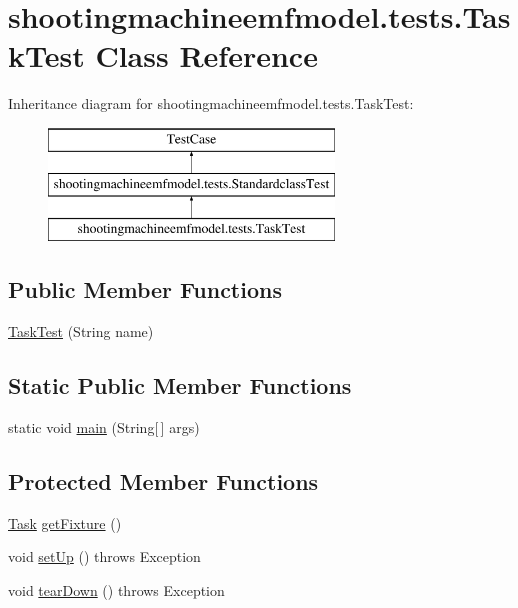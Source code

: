 \hypertarget{classshootingmachineemfmodel_1_1tests_1_1_task_test}{\section{shootingmachineemfmodel.\-tests.\-Task\-Test Class Reference}
\label{classshootingmachineemfmodel_1_1tests_1_1_task_test}
}
Inheritance diagram for shootingmachineemfmodel.\-tests.\-Task\-Test\-:\begin{figure}[H]
\begin{center}
\leavevmode
\includegraphics[height=3.000000cm]{classshootingmachineemfmodel_1_1tests_1_1_task_test}
\end{center}
\end{figure}
\subsection*{Public Member Functions}
\begin{DoxyCompactItemize}
\item 
\hyperlink{classshootingmachineemfmodel_1_1tests_1_1_task_test_a4b46325b12e11073c10f674c52447752}{Task\-Test} (String name)
\end{DoxyCompactItemize}
\subsection*{Static Public Member Functions}
\begin{DoxyCompactItemize}
\item 
static void \hyperlink{classshootingmachineemfmodel_1_1tests_1_1_task_test_a0e65b0276d315173c066ba70a8f29bd1}{main} (String\mbox{[}$\,$\mbox{]} args)
\end{DoxyCompactItemize}
\subsection*{Protected Member Functions}
\begin{DoxyCompactItemize}
\item 
\hyperlink{interfaceshootingmachineemfmodel_1_1_task}{Task} \hyperlink{classshootingmachineemfmodel_1_1tests_1_1_task_test_a1b6226741485449dbb6a3c9d65d60a35}{get\-Fixture} ()
\item 
void \hyperlink{classshootingmachineemfmodel_1_1tests_1_1_task_test_a73f5c03c194fb90aaa9d711fccf2a411}{set\-Up} ()  throws Exception 
\item 
void \hyperlink{classshootingmachineemfmodel_1_1tests_1_1_task_test_afe624a47188a8c7287131a79d4a7be6f}{tear\-Down} ()  throws Exception 
\end{DoxyCompactItemize}
